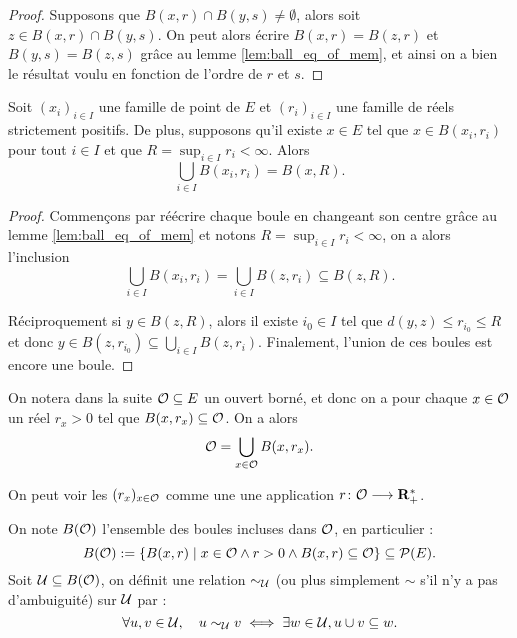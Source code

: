 \documentclass[../../rapport.tex]{subfiles}
\begin{document}
  \begin{proof}
    Supposons que $B(x, r) \cap B(y, s) \not= \emptyset$, alors soit $z \in B(x, r) \cap B(y, s)$.
    On peut alors écrire $B(x, r) = B(z, r)$ et $B(y, s) = B(z, s)$ grâce au lemme \ref{lem:ball_eq_of_mem},
    et ainsi on a bien le résultat voulu en fonction de l'ordre de $r$ et $s$.
  \end{proof}

  \begin{lemma}
    \label{lem:union_mem_balls}
    Soit $(x_i)_{i\in I}$ une famille de point de $E$ et $(r_i)_{i\in I}$ une famille de réels strictement positifs.
    De plus, supposons qu'il existe $x \in E$ tel que $x \in B(x_i, r_i)$ pour tout $i \in I$ et que $R = \sup_{i\in I}{r_i} < \infty$.
    Alors
    $$\bigcup_{i \in I}B(x_i, r_i) = B(x, R).$$
  \end{lemma}

  \begin{proof}
    Commençons par réécrire chaque boule en changeant son centre grâce au lemme \ref{lem:ball_eq_of_mem} et
    notons $R = \sup_{i\in I}{r_i} < \infty$, on a alors l'inclusion
    $$\bigcup_{i\in I}B(x_i, r_i) = \bigcup_{i\in I}{B(z, r_i)} \subseteq B(z, R).$$

    Réciproquement si $y \in B(z, R)$, alors il existe $i_0 \in I$ tel que $d(y, z) \le r_{i_0} \le R$
    et donc $y \in B(z, r_{i_0}) \subseteq \bigcup_{i\in I}{B(z, r_i)}$.
    Finalement, l'union de ces boules est encore une boule.
  \end{proof}

  On notera dans la suite $\mathcal{O} \subseteq E$ un ouvert borné,
  et donc on a pour chaque $x \in \mathcal{O}$ un réel $r_x > 0$ tel que $B(x, r_x) \subseteq \mathcal{O}$.
  On a alors
  $$\mathcal{O} = \bigcup_{x\in\mathcal{O}}{B(x, r_x)}.$$

  \begin{remark}
    On peut voir les $(r_x)_{x\in\mathcal{O}}$ comme une une application $r \colon \mathcal{O} \longrightarrow \mathbf R^*_+$.
  \end{remark}

  \begin{definition}
    On note $B(\mathcal{O})$ l'ensemble des boules incluses dans $\mathcal{O}$, en particulier :
    $$B(\mathcal{O}) := \left\{B(x, r) \mid x \in \mathcal{O} \land r > 0 \land B(x, r) \subseteq \mathcal{O}\right\} \subseteq \mathcal{P}(E).$$
    Soit $\mathcal U \subseteq B(\mathcal{O})$, on définit une relation $\sim_{\mathcal U}$ (ou plus simplement $\sim$ s'il n'y a pas d'ambuiguité) sur $\mathcal U$ par :
    $$\forall u, v \in \mathcal U, \hspace{1em} u \sim_{\mathcal U} v \iff \exists w \in \mathcal U, u \cup v \subseteq w.$$
  \end{definition}
\end{document}
